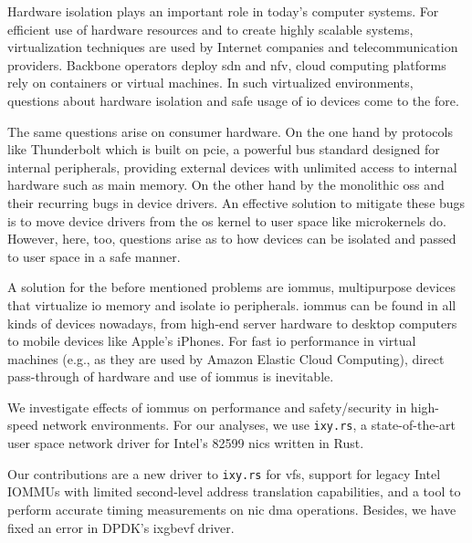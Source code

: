 \small

Hardware isolation plays an important role in today's computer systems. For
efficient use of hardware resources and to create highly scalable systems,
virtualization techniques are used by Internet companies and telecommunication
providers. Backbone operators deploy \ac{sdn} and \ac{nfv}, cloud computing
platforms rely on containers or virtual machines. In such virtualized
environments, questions about hardware isolation and safe usage of \acs{io}
devices come to the fore.

The same questions arise on consumer hardware. On the one hand by protocols like
Thunderbolt which is built on \acs{pcie}, a powerful bus standard designed for
internal peripherals, providing external devices with unlimited access to
internal hardware such as main memory. On the other hand by the monolithic
\acp{os} and their recurring bugs in device drivers. An effective solution to
mitigate these bugs is to move device drivers from the \ac{os} kernel to user
space like microkernels do. However, here, too, questions arise as to how
devices can be isolated and passed to user space in a safe manner.

A solution for the before mentioned problems are \acp{iommu}, multipurpose
devices that virtualize \ac{io} memory and isolate \ac{io} peripherals.
\acp{iommu} can be found in all kinds of devices nowadays, from high-end server
hardware to desktop computers to mobile devices like Apple's iPhones. For fast
\ac{io} performance in virtual machines (e.g., as they are used by Amazon
Elastic Cloud Computing), direct pass-through of hardware and use of \acp{iommu}
is inevitable.

We investigate effects of \acp{iommu} on performance and safety/security in
high-speed network environments. For our analyses, we use \texttt{ixy.rs}, a
state-of-the-art user space network driver for Intel's 82599 \acp{nic} written
in Rust.

Our contributions are a new driver to \texttt{ixy.rs} for \acp{vf}, support for
legacy Intel IOMMUs with limited second-level address translation capabilities,
and a tool to perform accurate timing measurements on \ac{nic} \acs{dma}
operations. Besides, we have fixed an error in DPDK's ixgbevf driver.

